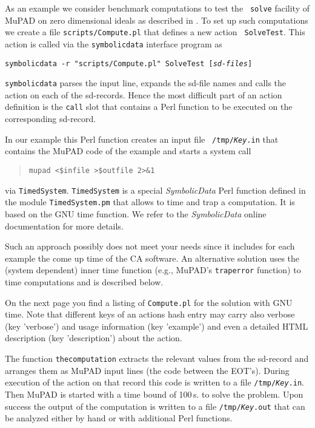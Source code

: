 \documentclass[11pt]{article}
\newcommand{\SD}{{\em Symbo\-lic\-Data}}
\begin{document}
As an example we consider benchmark computations to test the {\tt
solve} facility of MuPAD on zero dimensional ideals as described
in \cite{Graebe_99b}.  To set up such computations we create a
file {\tt scripts/Compute.pl} that defines a new action {\tt
SolveTest}. This action is called via the {\tt symbolicdata}
interface program as 
\begin{center}
\tt symbolicdata -r "scripts/Compute.pl" SolveTest [{\it sd-files}]
\end{center}
{\tt symbolicdata} parses the input line, expands the sd-file
names and calls the action on each of the sd-records.  Hence the
most difficult part of an action definition is the {\tt call}
slot that contains a Perl function to be executed on the
corresponding sd-record.

In our example this Perl function creates an input file {\tt
/tmp/{\it Key}.in} that contains the MuPAD code of the example
and starts a system call
\begin{quote}\tt mupad <\$infile >\$outfile 2>\&1\end{quote}
via {\tt TimedSystem}. {\tt TimedSystem} is a special {\SD} Perl
function defined in the module {\tt TimedSystem.pm} that allows to
time and trap a computation. It is based on the GNU {time} function.
We refer to the {\SD} online documentation for more details.

Such an approach possibly does not meet your needs since it includes
for each example the come up time of the CA software. An alternative
solution uses the (system dependent) inner time function (e.g.,
MuPAD's {\tt traperror} function) to time computations and is
described below.

On the next page you find a listing of {\tt Compute.pl} for the
solution with GNU {time}. Note that different keys of an actions hash
entry may carry also verbose (key 'verbose') and usage information
(key 'example') and even a detailed HTML description (key
'description') about the action. 

The function {\tt thecomputation} extracts the relevant values from
the sd-record and arranges them as MuPAD input lines (the code between
the EOT's). During execution of the action on that record this code is
written to a file {\tt /tmp/{\it Key}.in}. Then MuPAD is started with
a time bound of 100\,s. to solve the problem.  Upon success the output
of the computation is written to a file {\tt /tmp/{\it Key}.out}
that can be analyzed either by hand or with additional Perl functions.
\end{document}
